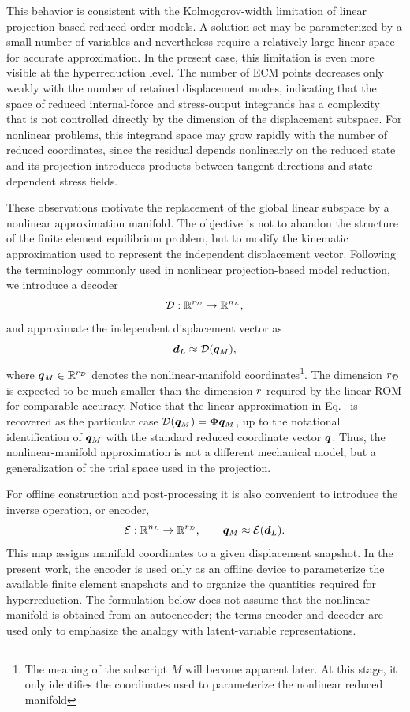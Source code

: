 \documentclass[11pt,a4paper]{article}
\begin{document}
This behavior is consistent with the Kolmogorov-width limitation of linear
projection-based reduced-order models. A solution set may be parameterized by a
small number of variables and nevertheless require a relatively large linear
space for accurate approximation. In the present case, this limitation is even
more visible at the hyperreduction level. The number of ECM points decreases
only weakly with the number of retained displacement modes, indicating that the
space of reduced internal-force and stress-output integrands has a complexity
that is not controlled directly by the dimension of the displacement subspace.
For nonlinear problems, this integrand space may grow rapidly with the number
of reduced coordinates, since the residual depends nonlinearly on the reduced
state and its projection introduces products between tangent directions and
state-dependent stress fields.

These observations motivate the replacement of the global linear subspace by a
nonlinear approximation manifold. The objective is not to abandon the structure
of the finite element equilibrium problem, but to modify the kinematic
approximation used to represent the independent displacement vector. Following
the terminology commonly used in nonlinear projection-based model reduction, we
introduce a decoder
\[
\mathcal{\boldsymbol{D}}:\mathbb{R}^{r_{\mathcal{D}}}\rightarrow \mathbb{R}^{n_L},
\]
and approximate the independent displacement vector as
\begin{equation}
\label{eq:dredNON}
\bm{d}_L \approx \mathcal{\boldsymbol{D}}(\bm{q}_M),
\end{equation}
where $\bm{q}_M\in\mathbb{R}^{r_{\mathcal{D}}}$ denotes the nonlinear-manifold coordinates\footnote{The
meaning of the subscript $M$ will become apparent later. At this stage, it only
identifies the coordinates used to parameterize the nonlinear reduced
manifold}. The dimension $r_{\mathcal{D}}$ is expected to be much smaller than the dimension $r$
required by the linear ROM for comparable accuracy. Notice that the linear approximation
in Eq.~ is recovered as the particular case $\mathcal{\boldsymbol{D}}(\bm{q}_M)=\bm{\Phi} \bm{q}_M$,
up to the notational identification of $\bm{q}_M$ with the standard reduced
coordinate vector $\bm{q}$. Thus, the nonlinear-manifold approximation is not a
different mechanical model, but a generalization of the trial space used in the
projection.

For offline construction and post-processing it is also convenient to introduce
the inverse operation, or encoder,
\[
\mathcal{\boldsymbol{E}}:\mathbb{R}^{n_L}\rightarrow \mathbb{R}^{r_{\mathcal{D}}},
\qquad
\bm{q}_M \approx \mathcal{\boldsymbol{E}}(\bm{d}_L).
\]
This map assigns manifold coordinates to a given displacement snapshot. In the
present work, the encoder is used only as an offline device to parameterize the
available finite element snapshots and to organize the quantities required for
hyperreduction. The formulation below does not assume that the nonlinear
manifold is obtained from an autoencoder; the terms encoder and decoder are
used only to emphasize the analogy with latent-variable representations.
\end{document}
